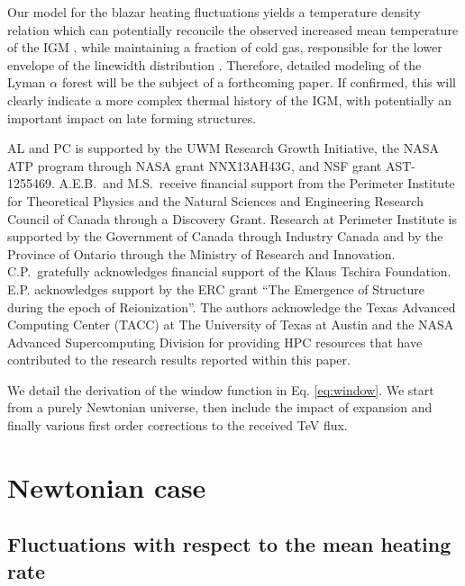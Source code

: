 \documentclass[twocolumns]{emulateapj}
\begin{document}
{Our model for the blazar heating fluctuations yields a temperature density relation which can potentially reconcile the observed increased mean temperature of the IGM \citep{2014MNRAS.441.1916B}, while maintaining a fraction of cold gas, responsible for the lower envelope of the linewidth distribution \citep{2012ApJ...757L..30R}. Therefore, detailed modeling of the Lyman $\alpha$ forest will be the subject of a forthcoming paper. If confirmed, this will clearly indicate a more complex  thermal history of the IGM, with potentially an important impact on late forming structures. 

}

\begin{acknowledgements}
AL and PC is supported by the UWM Research Growth Initiative, the NASA ATP
program through NASA grant NNX13AH43G, and NSF grant AST-1255469. 
A.E.B.~and M.S.~receive financial support from the Perimeter
Institute for Theoretical Physics and the Natural Sciences and
Engineering Research Council of Canada through a Discovery Grant.
Research at Perimeter Institute is supported by the Government of
Canada through Industry Canada and by the Province of Ontario through
the Ministry of Research and Innovation.
C.P.~gratefully acknowledges
financial support of the Klaus Tschira Foundation. E.P. acknowledges support by the ERC grant ``The Emergence of Structure during the epoch of Reionization''.
The authors acknowledge the Texas Advanced Computing Center (TACC) at The University of Texas at Austin and the NASA Advanced Supercomputing Division for providing HPC resources that have contributed to the research results reported within this paper. 
\end{acknowledgements}


\appendix

We detail the derivation of the window function in Eq. \ref{eq:window}. We start from a purely Newtonian universe, then include the impact of expansion and finally various first order corrections to the received TeV flux.
\section {Newtonian case}\label{sec:windon_newt}

\subsection {Fluctuations with respect to the mean heating rate}
\end{document}
